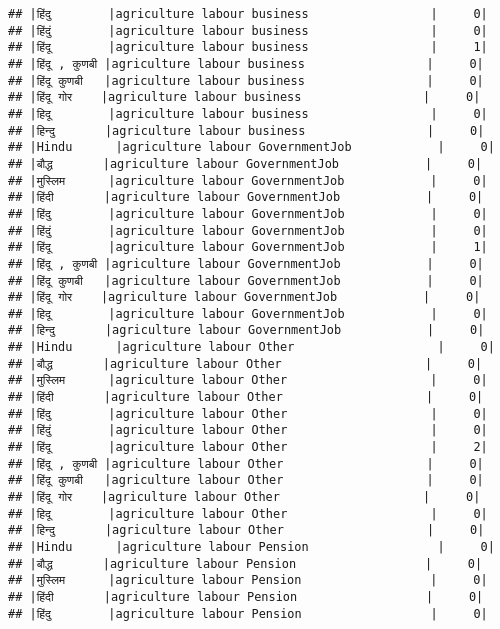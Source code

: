 \documentclass[
]{article}
\begin{document}
\begin{verbatim}
## |हिंदु        |agriculture labour business                 |     0|
## |हिंदुं        |agriculture labour business                 |     0|
## |हिंदू        |agriculture labour business                 |     1|
## |हिंदू , कुणबी |agriculture labour business                 |     0|
## |हिंदू कुणबी   |agriculture labour business                 |     0|
## |हिंदू गोर    |agriculture labour business                 |     0|
## |हिदू        |agriculture labour business                 |     0|
## |हिन्दु       |agriculture labour business                 |     0|
## |Hindu      |agriculture labour GovernmentJob            |     0|
## |बौद्ध       |agriculture labour GovernmentJob            |     0|
## |मुस्लिम      |agriculture labour GovernmentJob            |     0|
## |हिंदी       |agriculture labour GovernmentJob            |     0|
## |हिंदु        |agriculture labour GovernmentJob            |     0|
## |हिंदुं        |agriculture labour GovernmentJob            |     0|
## |हिंदू        |agriculture labour GovernmentJob            |     1|
## |हिंदू , कुणबी |agriculture labour GovernmentJob            |     0|
## |हिंदू कुणबी   |agriculture labour GovernmentJob            |     0|
## |हिंदू गोर    |agriculture labour GovernmentJob            |     0|
## |हिदू        |agriculture labour GovernmentJob            |     0|
## |हिन्दु       |agriculture labour GovernmentJob            |     0|
## |Hindu      |agriculture labour Other                    |     0|
## |बौद्ध       |agriculture labour Other                    |     0|
## |मुस्लिम      |agriculture labour Other                    |     0|
## |हिंदी       |agriculture labour Other                    |     0|
## |हिंदु        |agriculture labour Other                    |     0|
## |हिंदुं        |agriculture labour Other                    |     0|
## |हिंदू        |agriculture labour Other                    |     2|
## |हिंदू , कुणबी |agriculture labour Other                    |     0|
## |हिंदू कुणबी   |agriculture labour Other                    |     0|
## |हिंदू गोर    |agriculture labour Other                    |     0|
## |हिदू        |agriculture labour Other                    |     0|
## |हिन्दु       |agriculture labour Other                    |     0|
## |Hindu      |agriculture labour Pension                  |     0|
## |बौद्ध       |agriculture labour Pension                  |     0|
## |मुस्लिम      |agriculture labour Pension                  |     0|
## |हिंदी       |agriculture labour Pension                  |     0|
## |हिंदु        |agriculture labour Pension                  |     0|

\end{verbatim}
\end{document}
